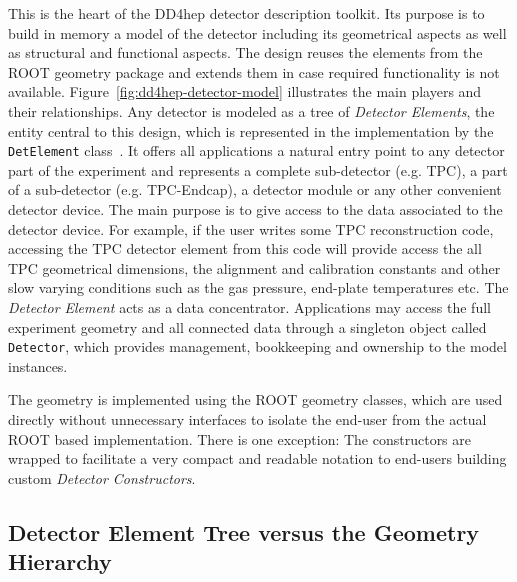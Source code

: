 This is the heart of the DD4hep detector description toolkit. Its purpose is  to build in memory a model of the detector including its geometrical aspects as well as structural and functional aspects. The design reuses the elements from the ROOT geometry package and extends them in case required functionality is not available. Figure~\ref{fig:dd4hep-detector-model} illustrates the main players and their relationships. Any detector is modeled as a tree of \textit{Detector Elements}, the entity  central to this design, which is represented in the implementation by  the \texttt{DetElement} class~\cite{Antunes-Nobrega:630827}. It offers all applications a natural entry point to any detector part of the experiment and represents a complete sub-detector (e.g. TPC), a part of a  sub-detector (e.g. TPC-Endcap), a detector module or any other convenient detector device.  The main purpose is to give access to the data associated to the detector device. For example, if the user writes some TPC reconstruction code, accessing the TPC detector element from this code will provide access  the all TPC geometrical dimensions, the alignment and calibration constants  and other slow varying conditions such as the gas pressure, end-plate  temperatures etc. The \textit{Detector Element} acts as a data concentrator. Applications may access the full experiment geometry and all connected data through a singleton object called \texttt{Detector}, which provides  management, bookkeeping and ownership to the model instances.

The geometry is implemented using the ROOT geometry classes, which are used directly without unnecessary interfaces to isolate the end-user from the  actual ROOT based implementation. There is one exception: The constructors are wrapped to facilitate a very compact and readable notation to end-users building custom \textit{Detector Constructors}.

\subsection{Detector Element Tree versus the Geometry Hierarchy}
\label{subsect:detelement-hierarchy}

